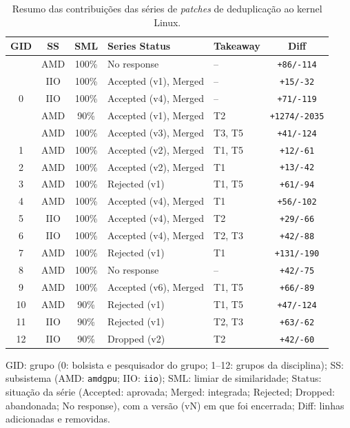 \documentclass[oneside]{abntlatex}
\begin{document}
\begin{table}[!ht]
\centering
\small\linespread{1.0}\selectfont
\begin{threeparttable}
    \caption{Resumo das contribuições das séries de \textit{patches} de deduplicação ao kernel Linux.}
    \label{tab:patches}
\begin{tabularx}{\textwidth}{ c c c X l c }
\toprule
\textbf{GID} & \textbf{SS} & \textbf{SML} & \textbf{Series Status} & \textbf{Takeaway} & \textbf{Diff} \\
\midrule
\multirow[t]{5}{*}{0} & AMD & 100\% & No response & -- & \texttt{+86/-114} \\
  & IIO & 100\% & Accepted (v1), Merged & -- & \texttt{+15/-32} \\
  & IIO & 100\% & Accepted (v4), Merged & -- & \texttt{+71/-119} \\
  & AMD & 90\% & Accepted (v1), Merged & T2 & \texttt{+1274/-2035} \\
  & AMD & 100\% & Accepted (v3), Merged & T3, T5 & \texttt{+41/-124} \\
1 & AMD & 100\% & Accepted (v2), Merged & T1, T5 & \texttt{+12/-61} \\
2 & AMD & 100\% & Accepted (v2), Merged & T1 & \texttt{+13/-42} \\
3 & AMD & 100\% & Rejected (v1) & T1, T5 & \texttt{+61/-94} \\
4 & AMD & 100\% & Accepted (v4), Merged & T1 & \texttt{+56/-102} \\
5 & IIO & 100\% & Accepted (v4), Merged & T2 & \texttt{+29/-66} \\
6 & IIO & 100\% & Accepted (v4), Merged & T2, T3 & \texttt{+42/-88} \\
7 & AMD & 100\% & Rejected (v1) & T1 & \texttt{+131/-190} \\
8 & AMD & 100\% & No response & -- & \texttt{+42/-75} \\
9 & AMD & 100\% & Accepted (v6), Merged & T1, T5 & \texttt{+66/-89} \\
10 & AMD & 90\% & Rejected (v1) & T1, T5 & \texttt{+47/-124} \\
11 & IIO & 90\% & Rejected (v1) & T2, T3 & \texttt{+63/-62} \\
12 & IIO & 90\% & Dropped (v2) & T2 & \texttt{+42/-60} \\
\bottomrule
\end{tabularx}
\begin{tablenotes}[flushleft]
\footnotesize
\item[a] GID: grupo (0: bolsista e pesquisador do grupo; 1--12: grupos da disciplina); SS: subsistema (AMD: \texttt{amdgpu}; IIO: \texttt{iio}); SML: limiar de similaridade; Status: situação da série (Accepted: aprovada; Merged: integrada; Rejected; Dropped: abandonada; No response), com a versão (vN) em que foi encerrada; Diff: linhas adicionadas e removidas.
\end{tablenotes}
\end{threeparttable}
\end{table}
\end{document}
